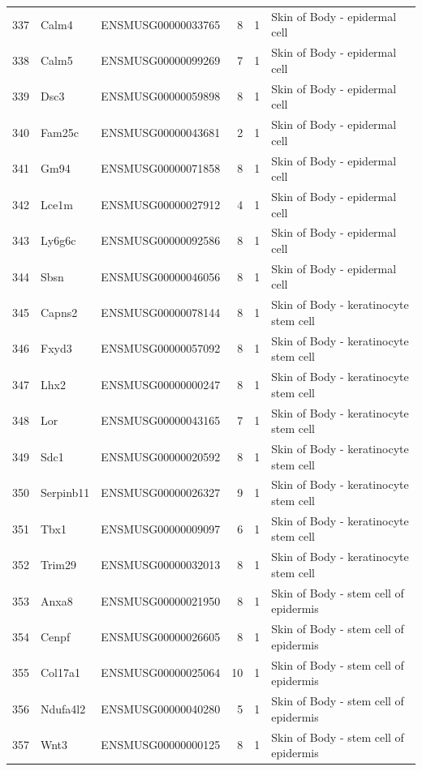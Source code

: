 \begin{table}[ht]
{\begin{tabular}{lllrrl}
        337 & Calm4 & ENSMUSG00000033765 & 8 & 1 & Skin of Body - epidermal cell \\
        338 & Calm5 & ENSMUSG00000099269 & 7 & 1 & Skin of Body - epidermal cell \\
        339 & Dsc3 & ENSMUSG00000059898 & 8 & 1 & Skin of Body - epidermal cell \\
        340 & Fam25c & ENSMUSG00000043681 & 2 & 1 & Skin of Body - epidermal cell \\
        341 & Gm94 & ENSMUSG00000071858 & 8 & 1 & Skin of Body - epidermal cell \\
        342 & Lce1m & ENSMUSG00000027912 & 4 & 1 & Skin of Body - epidermal cell \\
        343 & Ly6g6c & ENSMUSG00000092586 & 8 & 1 & Skin of Body - epidermal cell \\
        344 & Sbsn & ENSMUSG00000046056 & 8 & 1 & Skin of Body - epidermal cell \\
        345 & Capns2 & ENSMUSG00000078144 & 8 & 1 & Skin of Body - keratinocyte stem cell \\
        346 & Fxyd3 & ENSMUSG00000057092 & 8 & 1 & Skin of Body - keratinocyte stem cell \\
        347 & Lhx2 & ENSMUSG00000000247 & 8 & 1 & Skin of Body - keratinocyte stem cell \\
        348 & Lor & ENSMUSG00000043165 & 7 & 1 & Skin of Body - keratinocyte stem cell \\
        349 & Sdc1 & ENSMUSG00000020592 & 8 & 1 & Skin of Body - keratinocyte stem cell \\
        350 & Serpinb11 & ENSMUSG00000026327 & 9 & 1 & Skin of Body - keratinocyte stem cell \\
        351 & Tbx1 & ENSMUSG00000009097 & 6 & 1 & Skin of Body - keratinocyte stem cell \\
        352 & Trim29 & ENSMUSG00000032013 & 8 & 1 & Skin of Body - keratinocyte stem cell \\
        353 & Anxa8 & ENSMUSG00000021950 & 8 & 1 & Skin of Body - stem cell of epidermis \\
        354 & Cenpf & ENSMUSG00000026605 & 8 & 1 & Skin of Body - stem cell of epidermis \\
        355 & Col17a1 & ENSMUSG00000025064 & 10 & 1 & Skin of Body - stem cell of epidermis \\
        356 & Ndufa4l2 & ENSMUSG00000040280 & 5 & 1 & Skin of Body - stem cell of epidermis \\
        357 & Wnt3 & ENSMUSG00000000125 & 8 & 1 & Skin of Body - stem cell of epidermis \\

\end{tabular}}
\end{table}
